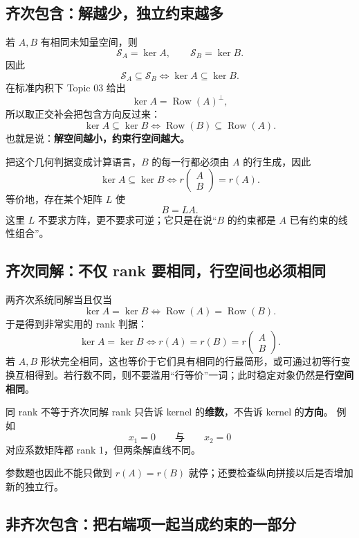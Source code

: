 \documentclass[11pt,a4paper]{ctexart}
\newcommand{\kw}[1]{\textbf{\color{deep}#1}}
\begin{document}
\subsection{齐次包含：解越少，独立约束越多}

若 $A,B$ 有相同未知量空间，则
\[
\mathcal S_A=\ker A,
\qquad
\mathcal S_B=\ker B.
\]
因此
\[
\boxed{\mathcal S_A\subseteq\mathcal S_B
\iff
\ker A\subseteq\ker B.}
\]
在标准内积下 Topic 03 给出
\[
\ker A=\operatorname{Row}(A)^\perp,
\]
所以取正交补会把包含方向反过来：
\[
\boxed{
\ker A\subseteq\ker B
\iff
\operatorname{Row}(B)\subseteq\operatorname{Row}(A).
}
\]
也就是说：\kw{解空间越小，约束行空间越大。}

把这个几何判据变成计算语言，$B$ 的每一行都必须由 $A$ 的行生成，因此
\[
\boxed{
\ker A\subseteq\ker B
\iff
r\begin{pmatrix}A\\B\end{pmatrix}=r(A).
}
\]
等价地，存在某个矩阵 $L$ 使
\[
B=LA.
\]
这里 $L$ 不要求方阵，更不要求可逆；它只是在说“$B$ 的约束都是 $A$ 已有约束的线性组合”。

\subsection{齐次同解：不仅 rank 要相同，行空间也必须相同}

两齐次系统同解当且仅当
\[
\ker A=\ker B
\iff
\operatorname{Row}(A)=\operatorname{Row}(B).
\]
于是得到非常实用的 rank 判据：
\[
\boxed{
\ker A=\ker B
\iff
r(A)=r(B)=r\begin{pmatrix}A\\B\end{pmatrix}.
}
\]
若 $A,B$ 形状完全相同，这也等价于它们具有相同的行最简形，或可通过初等行变换互相得到。若行数不同，则不要滥用“行等价”一词；此时稳定对象仍然是\kw{行空间相同}。

\begin{warnbox}{同 rank 不等于齐次同解}
rank 只告诉 kernel 的\kw{维数}，不告诉 kernel 的\kw{方向}。
例如
\[
x_1=0
\qquad\text{与}\qquad
x_2=0
\]
对应系数矩阵都 rank 1，但两条解直线不同。

参数题也因此不能只做到 $r(A)=r(B)$ 就停；还要检查纵向拼接以后是否增加新的独立行。
\end{warnbox}

\subsection{非齐次包含：把右端项一起当成约束的一部分}
\end{document}
